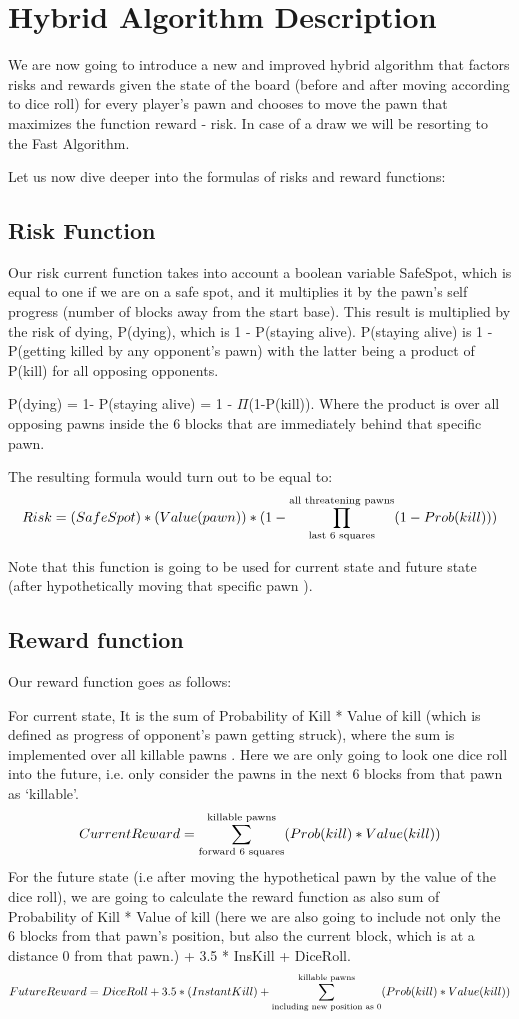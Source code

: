 \documentclass{article} %
\begin{document}
\section{Hybrid Algorithm Description}
We are now going to introduce a new and improved hybrid algorithm that factors risks and rewards given the state of the board (before and after moving according to dice roll) for every player’s pawn and chooses to move the pawn that maximizes the function reward - risk. In case of a draw we will be resorting to the Fast Algorithm. 

Let us now dive deeper into the formulas of risks and reward functions:

\subsection{Risk Function}
Our risk current function takes into account a boolean variable SafeSpot, which is equal to one if we are on a safe spot, and it multiplies it by the pawn’s self progress (number of blocks away from the start base). This result is multiplied by the risk of dying, P(dying), which is 1 - P(staying alive). 
P(staying alive) is 1 - P(getting killed by any opponent’s pawn) with the latter being a product of P(kill) for all opposing opponents. 

P(dying) = 1- P(staying alive) = 1 - $\Pi$(1-P(kill)). Where the product is over all opposing pawns inside the 6 blocks that are immediately behind that specific pawn. 

The resulting formula would turn out to be equal to: 
$$
Risk = (SafeSpot) * (Value(pawn)) * (1 - 
\prod_{\textnormal{last 6 squares}}^{\textnormal{all threatening pawns}} (1 - Prob(kill)) )
$$

Note that this function is going to be used for current state and future state (after hypothetically moving that specific pawn ).

\subsection{Reward function}

Our reward function goes as follows: 

For current state, It is the sum of Probability of Kill * Value of kill (which is defined as progress of opponent’s pawn getting struck), where the sum is implemented over all killable pawns . Here we are only going to look one dice roll into the future, i.e. only consider the pawns in the next 6 blocks from that pawn as ‘killable’. 
$$
CurrentReward =\sum_{\textnormal{forward 6 squares}}^{\textnormal{killable pawns}}(Prob(kill) * Value(kill)) 
$$
For the future state (i.e after moving the hypothetical pawn by the value of the dice roll), we are going to calculate the reward function as also sum of Probability of Kill * Value of kill (here we are also going to include not only the 6 blocks from that pawn’s position, but also the current block, which is at a distance 0 from that pawn.) + 3.5 * InsKill + DiceRoll.
$$
FutureReward =DiceRoll + 3.5*(InstantKill) +\sum_{\textnormal{including new position as 0}}^{\textnormal{killable pawns}}(Prob(kill) * Value(kill)) 
$$
\end{document}
